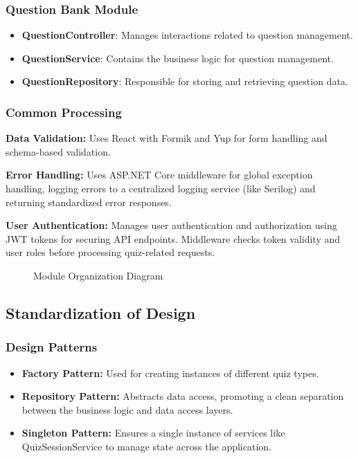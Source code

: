 \subsubsection{Question Bank Module}

\begin{itemize}
  \item \textbf{QuestionController}: Manages interactions related to question management.
  \item \textbf{QuestionService}: Contains the business logic for question management.
  \item \textbf{QuestionRepository}: Responsible for storing and retrieving question data.
\end{itemize}

\subsubsection{Common Processing}

\item \textbf{Data Validation:} Uses React with Formik and Yup for form handling and schema-based validation.

\item \textbf{Error Handling:} Uses ASP.NET Core middleware for global exception handling, logging errors to a centralized logging service (like Serilog) and returning standardized error responses.

\item \textbf{User Authentication:} Manages user authentication and authorization using JWT tokens for securing API endpoints. Middleware checks token validity and user roles before processing quiz-related requests.

\begin{figure}[htbp]
    \centering
    \caption{Module Organization Diagram}
    \label{fig:development}
\end{figure}

\subsection{Standardization of Design}

\subsubsection{Design Patterns}

\begin{itemize}
  \item \textbf{Factory Pattern:} Used for creating instances of different quiz types.
  \item \textbf{Repository Pattern:} Abstracts data access, promoting a clean separation between the business logic and data access layers.
  \item \textbf{Singleton Pattern:} Ensures a single instance of services like QuizSessionService to manage state across the application.
\end{itemize}

